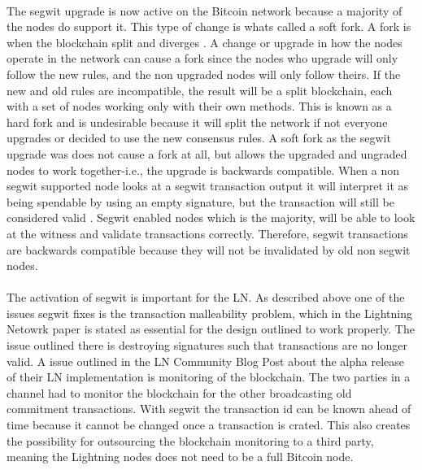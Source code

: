\documentclass[informationsecurity]{gucmasterproject}
\begin{document}
\paragraph{}
The segwit upgrade is now active on the Bitcoin network because a majority of the nodes do support it. This type of change is whats called a soft fork. A fork is when the blockchain split and diverges \cite{antonopoulos2017mastering}. A change or upgrade in how the nodes operate in the network can cause a fork since the nodes who upgrade will only follow the new rules, and the non upgraded nodes will only follow theirs. If the new and old rules are incompatible, the result will be a split blockchain, each with a set of nodes working only with their own methods. This is known as a hard fork and is undesirable because it will split the network if not everyone upgrades or decided to use the new consensus rules. A soft fork as the segwit upgrade was does not cause a fork at all, but allows the upgraded and ungraded nodes to work together-i.e., the upgrade is backwards compatible. When a non segwit supported node looks at a segwit transaction output it will interpret it as being spendable by using an empty signature, but the transaction will still be considered valid \cite{antonopoulos2017mastering}. Segwit enabled nodes which is the majority, will be able to look at the witness and validate transactions correctly. Therefore, segwit transactions are backwards compatible because they will not be invalidated by old non segwit nodes.

\paragraph{}
The activation of segwit is important for the LN. As described above one of the issues segwit fixes is the transaction malleability problem, which in the Lightning Netowrk paper \cite{poon2015bitcoin} is stated as essential for the design outlined to work properly. The issue outlined there is destroying signatures such that transactions are no longer valid. A issue outlined in the LN Community Blog Post\cite{LN_segwit} about the alpha release of their LN implementation is monitoring of the blockchain. The two parties in a channel had to monitor the blockchain for the other broadcasting old commitment transactions. With segwit the transaction id can be known ahead of time because it cannot be changed once a transaction is crated. This also creates the possibility for outsourcing the blockchain monitoring to a third party, meaning the Lightning nodes does not need to be a full Bitcoin node.
\end{document}
